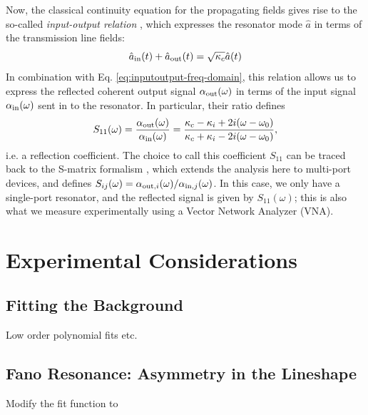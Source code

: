 \noindent Now, the classical continuity equation for the propagating fields gives rise to the so-called \textit{input-output relation} \cite{clerk2010introduction}, which expresses the resonator mode $\hat{a}$ in terms of the transmission line fields: 
\begin{equation}
    \hat{a}_{\rm in}(t) + \hat{a}_{\rm out}(t) = \sqrt{\kappa_c} \hat{a}(t)
    \label{eq:inputoutput}
\end{equation}
In combination with Eq. \eqref{eq:inputoutput-freq-domain}, this relation allows us to express the reflected coherent output signal $\alpha_{\rm out}(\omega)$ in terms of the input signal $\alpha_{\rm in}(\omega)$ sent in to the resonator. In particular, their ratio defines
\begin{equation}
   S_{11}(\omega) = \frac{\alpha_{\rm out}(\omega)}{\alpha_{\rm in}(\omega)} = \frac{\kappa_c - \kappa_i + 2i(\omega - \omega_0)}{\kappa_c + \kappa_i - 2i(\omega - \omega_0)},
\end{equation}
i.e. a reflection coefficient. The choice to call this coefficient $S_{11}$ can be traced back to the S-matrix formalism \cite{kurokawa1965power, gardiner1985input}, which extends the analysis here to multi-port devices, and defines $S_{ij}(\omega) = \alpha_{{\rm out}, i}(\omega)/\alpha_{{\rm in}, j}(\omega)$. In this case, we only have a single-port resonator, and the reflected signal is given by $S_{11}(\omega)$; this is also what we measure experimentally using a Vector Network Analyzer (VNA). 

\section{Experimental Considerations}

\subsection{Fitting the Background}
Low order polynomial fits etc.

\subsection{Fano Resonance: Asymmetry in the Lineshape}
Modify the fit function to 